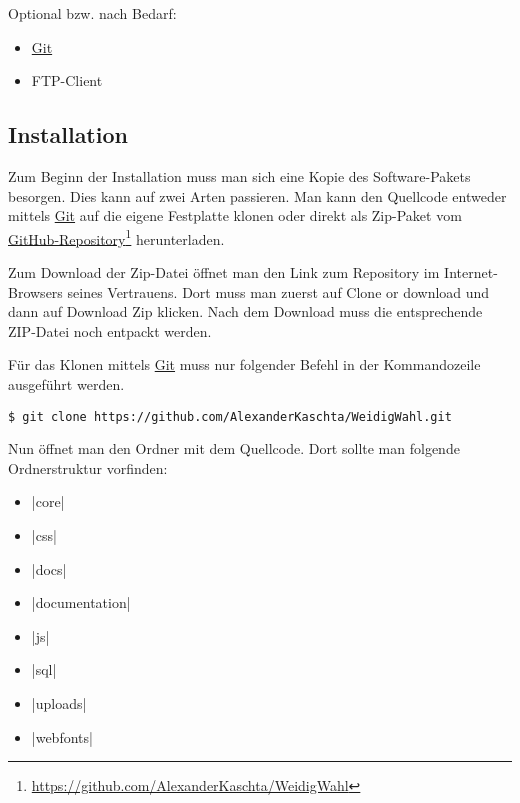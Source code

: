 \documentclass[ngerman]{ltxdoc}
\begin{document}
Optional bzw. nach Bedarf:

\begin{itemize}
  \item \href{https://git-scm.com/}{Git}
  \item FTP-Client
\end{itemize}

\subsection{Installation}

Zum Beginn der Installation muss man sich eine Kopie des Software-Pakets besorgen.
Dies kann auf zwei Arten passieren. Man kann den Quellcode entweder mittels \href{https://git-scm.com/}{Git}
auf die eigene Festplatte klonen oder direkt als Zip-Paket vom
\href{https://github.com/AlexanderKaschta/WeidigWahl}{GitHub-Repository}\footnote{\url{https://github.com/AlexanderKaschta/WeidigWahl}} herunterladen.

Zum Download der Zip-Datei öffnet man den Link zum Repository im Internet-Browsers
seines Vertrauens. Dort muss man zuerst auf \glqq Clone or download\grqq{} und dann
auf \glqq Download Zip\grqq{} klicken. Nach dem Download muss die entsprechende
ZIP-Datei noch entpackt werden.

Für das Klonen mittels \href{https://git-scm.com/}{Git} muss nur folgender Befehl
in der Kommandozeile ausgeführt werden.

\begin{lstlisting}[style=tex]
$ git clone https://github.com/AlexanderKaschta/WeidigWahl.git
\end{lstlisting}

Nun öffnet man den Ordner mit dem Quellcode. Dort sollte man folgende Ordnerstruktur vorfinden:

\begin{multicols}{3}
  \begin{itemize}
    \item |core|
    \item |css|
    \item |docs|
    \item |documentation|
    \item |js|
    \item |sql|
    \item |uploads|
    \item |webfonts|
  \end{itemize}
\end{multicols}
\end{document}
